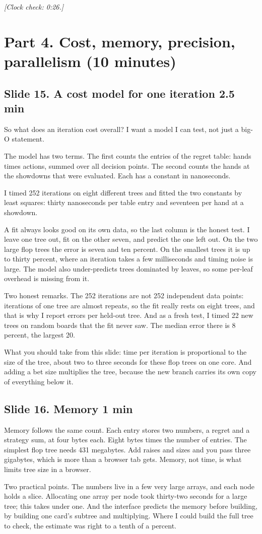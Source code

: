 \documentclass[11pt]{article}
\newcommand{\slidehead}[3]{\subsection*{Slide #1. #2 \hfill {\normalfont\small #3}}}
\newcommand{\cue}[1]{{\small\itshape\color{black!65}[#1]}}
\begin{document}
\cue{Clock check: 0:26.}

\section{Part 4. Cost, memory, precision, parallelism (10 minutes)}

\slidehead{15}{A cost model for one iteration}{2.5 min}
\begin{say}
So what does an iteration cost overall? I want a model I can test, not just a big-O statement.

The model has two terms. The first counts the entries of the regret table: hands times actions, summed over all
decision points. The second counts the hands at the showdowns that were evaluated. Each has a constant in
nanoseconds.

I timed 252 iterations on eight different trees and fitted the two constants by least squares: thirty nanoseconds
per table entry and seventeen per hand at a showdown.

A fit always looks good on its own data, so the last column is the honest test. I leave one tree out, fit on the
other seven, and predict the one left out. On the two large flop trees the error is seven and ten percent. On the
smallest trees it is up to thirty percent, where an iteration takes a few milliseconds and timing noise is large.
The model also under-predicts trees dominated by leaves, so some per-leaf overhead is missing from it.

Two honest remarks. The 252 iterations are not 252 independent data points: iterations of one tree are almost repeats, so
the fit really rests on eight trees, and that is why I report errors per held-out tree. And as a fresh test, I timed 22
new trees on random boards that the fit never saw. The median error there is 8 percent, the largest 20.

What you should take from this slide: time per iteration is proportional to the size of the tree, about two to
three seconds for these flop trees on one core. And adding a bet size multiplies the tree, because the new branch
carries its own copy of everything below it.
\end{say}

\slidehead{16}{Memory}{1 min}
\begin{say}
Memory follows the same count. Each entry stores two numbers, a regret and a strategy sum, at four bytes each. Eight
bytes times the number of entries. The simplest flop tree needs 431 megabytes. Add raises and sizes and you pass
three gigabytes, which is more than a browser tab gets. Memory, not time, is what limits tree size in a browser.

Two practical points. The numbers live in a few very large arrays, and each node holds a slice. Allocating one
array per node took thirty-two seconds for a large tree; this takes under one. And the interface predicts the
memory before building, by building one card's subtree and multiplying. Where I could build the full tree to
check, the estimate was right to a tenth of a percent.
\end{say}
\end{document}

